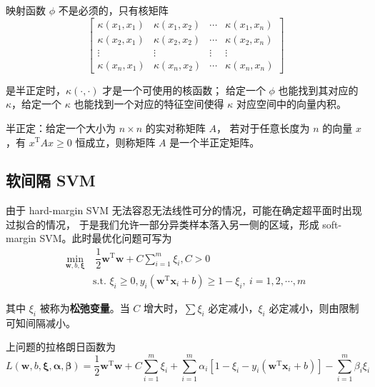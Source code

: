 映射函数 $\phi$ 不是必须的，只有核矩阵
\begin{equation}
    \begin{bmatrix}
        \kappa(x_1, x_1) & \kappa(x_1, x_2) & \cdots & \kappa(x_1, x_n) \\
        \kappa(x_2, x_1) & \kappa(x_2, x_2) & \cdots & \kappa(x_2, x_n) \\
        \vdots & \vdots & \vdots & \vdots \\
        \kappa(x_n, x_1) & \kappa(x_n, x_2) & \cdots & \kappa(x_n, x_n)
        \end{bmatrix}
\end{equation}

是半正定时，$\kappa(\cdot, \cdot)$ 才是一个可使用的核函数；
给定一个 $\phi$ 也能找到其对应的 $\kappa$，给定一个 $\kappa$ 也能找到一个对应的特征空间使得 $\kappa$ 对应空间中的向量内积。

\begin{definition}
    半正定：给定一个大小为 $n \times n$ 的实对称矩阵 $A$，
    若对于任意长度为 $n$ 的向量 $x$，有 $x^\mathrm TAx\geq 0$ 恒成立，则称矩阵 $A$ 是一个半正定矩阵。
\end{definition}

\subsection{软间隔 SVM}
由于 hard-margin SVM 无法容忍无法线性可分的情况，可能在确定超平面时出现过拟合的情况，
于是我们允许一部分异类样本落入另一侧的区域，形成 soft-margin SVM。此时最优化问题可写为
\begin{equation}
    \begin{aligned}
        \underset{\boldsymbol w, b, \boldsymbol \xi}{\min}&\  \dfrac 12 \boldsymbol w^\mathrm T \boldsymbol w + C \sum_{i = 1}^m \xi_i, C > 0 \\
        &\text{s.t. } \xi_i \geq 0, y_i(\boldsymbol w^\mathrm T \boldsymbol x_i + b) \geq 1 - \xi_i,\ i = 1, 2, \cdots, m
    \end{aligned}
\end{equation}

其中 $\xi_i$ 被称为\textbf{松弛变量}。当 $C$ 增大时，$\sum \xi_i$ 必定减小，$\xi_i$ 必定减小，则由限制可知间隔减小。

上问题的拉格朗日函数为
\begin{equation}
    L(\boldsymbol w, b, \boldsymbol \xi, \boldsymbol \alpha, \boldsymbol \beta) = 
    \dfrac 12 \boldsymbol w^\mathrm T \boldsymbol w + C\sum_{i = 1}^m \xi_i 
    + \sum_{i = 1}^m \alpha_i[1 - \xi_i - y_i(\boldsymbol w^\mathrm T \boldsymbol x_i + b)] 
    - \sum_{i = 1}^m \beta_i \xi_i
\end{equation}

